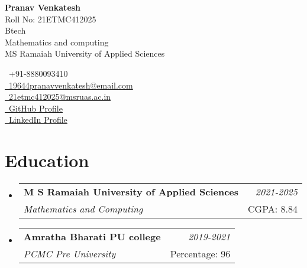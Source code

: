 \documentclass[a4paper,11pt]{article}
\makeatletter
\newcommand{\resumeSubheading}[4]{
\vspace{0.5mm}\item
    \begin{tabular*}{0.98\textwidth}[t]{l@{\extracolsep{\fill}}r}
        \textbf{#1} & \textit{\footnotesize{#4}} \\
        \textit{\footnotesize{#3}} &  \footnotesize{#2}\\
    \end{tabular*}
    \vspace{-2.4mm}
}
\newcommand{\resumeSubHeadingListStart}{\begin{itemize}[leftmargin=*,labelsep=0mm]}
\newcommand{\resumeSubHeadingListEnd}{\end{itemize}\vspace{2mm}}
\newcommand{\name}{Pranav Venkatesh} %
\newcommand{\course}{Btech} %
\newcommand{\roll}{21ETMC412025} %
\newcommand{\phone}{8880093410} %
\newcommand{\emaila}{19644pranavvenkatesh@email.com} %
\newcommand{\emailb}{21etmc412025@msruas.ac.in} %
\makeatother
\begin{document}
\selectfont


\parbox{\dimexpr\linewidth\relax}{
\begin{minipage}[t]{0.5\linewidth}
  \textbf{\Large \name} \\
  {Roll No: \roll} \\
  \course \\
  {Mathematics and computing} \\
  {MS Ramaiah University of Applied Sciences}
\end{minipage}%
\hfill
\begin{minipage}[t]{0.5\linewidth} %
  \raggedleft
  {\raisebox{0.0\height}{\footnotesize \faPhone}\ +91-\phone} \\
  \href{mailto:\emaila}{\raisebox{0.0\height}{\footnotesize \faEnvelope}\ {\emaila}} \\
  \href{mailto:\emailb}{\raisebox{0.0\height}{\footnotesize \faEnvelope}\ {\emailb}} \\
  \href{https://github.com/DaiSwap/}{\raisebox{0.0\height}{\footnotesize \faGithub}\ {GitHub Profile}} \\
  \href{https://www.linkedin.com/in/pranav-venkatesh-bbbb97225/}{\raisebox{0.0\height}{\footnotesize \faLinkedin}\ {LinkedIn Profile}}
\end{minipage}
}






\section{\textbf{Education}}
  \resumeSubHeadingListStart
    \resumeSubheading
      {M S Ramaiah University of Applied Sciences}{CGPA: 8.84}
      {Mathematics and Computing}{2021-2025}
    \resumeSubheading
      {Amratha Bharati PU college}{Percentage: 96}
      {PCMC Pre University}{2019-2021}
    
  \resumeSubHeadingListEnd
\vspace{-5.5mm}
%



\end{document}
